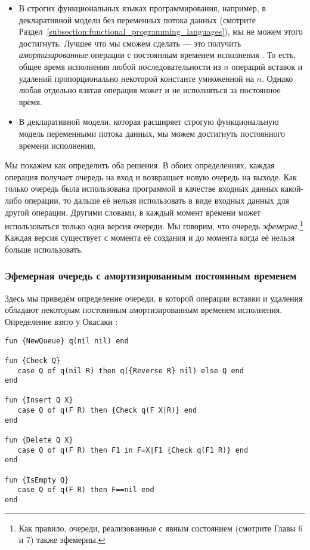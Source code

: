 \begin{itemize}
\item{В строгих функциональных языках программирования, например, в декларативной модели без переменных потока данных (смотрите Раздел~\ref{subsection:functional_programming_languages}), мы не можем этого достигнуть. Лучшее что мы сможем сделать --- это получить \emph{амортизированные} операции с постоянным временем исполнения \cite{138}. То есть, общее время исполнения любой последовательности из $n$ операций вставок и удалений пропорционально некоторой константе умноженной на $n$. Однако любая отдельно взятая операция может и не исполняться за постоянное время.}

\item{В декларативной модели, которая расширяет строгую функциональную модель переменными потока данных, мы можем достигнуть постоянного времени исполнения.}
\end{itemize}

Мы покажем как определить оба решения. В обоих определениях, каждая операция получает очередь на вход и возвращает новую очередь на выходе. Как только очередь была использована программой в качестве входных данных какой-либо операции, то дальше её нельзя использовать в виде входных данных для другой операции. Другими словами, в каждый момент времени может использоваться только одна версия очереди. Мы говорим, что очередь \emph{эфемерна}.\footnote{Как правило, очереди, реализованные с явным состоянием (смотрите Главы 6 и 7) также эфемерны.} Каждая версия существует с момента её создания и до момента когда её нельзя больше использовать.

\subsubsection{Эфемерная очередь с амортизированным постоянным временем}

Здесь мы приведём определение очереди, в которой операции вставки и удаления обладают некоторым постоянным амортизированным временем исполнения. Определение взято у Окасаки \cite{138}:

\begin{lstlisting}
fun {NewQueue} q(nil nil) end

fun {Check Q}
   case Q of q(nil R) then q({Reverse R} nil) else Q end
end

fun {Insert Q X}
   case Q of q(F R) then {Check q(F X|R)} end
end

fun {Delete Q X}
   case Q of q(F R) then F1 in F=X|F1 {Check q(F1 R)} end
end

fun {IsEmpty Q}
   case Q of q(F R) then F==nil end
end
\end{lstlisting}

